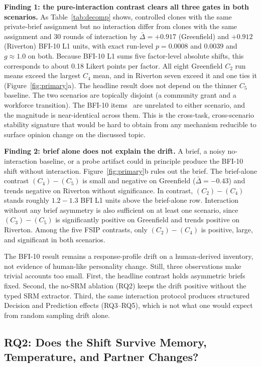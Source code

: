 \textbf{Finding 1: the pure-interaction contrast clears all three gates in both scenarios.} As Table~\ref{tab:decomp} shows, controlled clones with the same private-brief assignment but no interaction differ from clones with the same assignment and 30 rounds of interaction by $\bar{\Delta}{=}{+}0.917$ (Greenfield) and ${+}0.912$ (Riverton) BFI-10 L1 units, with exact run-level $p{=}0.0008$ and $0.0039$ and $g{\approx}1.0$ on both. Because BFI-10 L1 sums five factor-level absolute shifts, this corresponds to about 0.18 Likert points per factor. All eight Greenfield $C_2$ run means exceed the largest $C_4$ mean, and in Riverton seven exceed it and one ties it (Figure~\ref{fig:primary}a). The headline result does not depend on the thinner $C_5$ baseline. The two scenarios are topically disjoint (a community grant and a workforce transition). The BFI-10 items~\citep{Rammstedt2007_BFI10,PsychoBench} are unrelated to either scenario, and the magnitude is near-identical across them. This is the cross-task, cross-scenario stability signature that would be hard to obtain from any mechanism reducible to surface opinion change on the discussed topic.

\textbf{Finding 2: brief alone does not explain the drift.} A brief, a noisy no-interaction baseline, or a probe artifact could in principle produce the BFI-10 shift without interaction. Figure~\ref{fig:primary}b rules out the brief. The brief-alone contrast $(C_4){-}(C_5)$ is small and negative on Greenfield ($\bar{\Delta}{=}{-}0.43$) and trends negative on Riverton without significance. In contrast, $(C_2){-}(C_4)$ stands roughly $1.2{-}1.3$ BFI L1 units above the brief-alone row. Interaction without any brief asymmetry is also sufficient on at least one scenario, since $(C_3){-}(C_5)$ is significantly positive on Greenfield and trends positive on Riverton. Among the five FSIP contrasts, only $(C_2){-}(C_4)$ is positive, large, and significant in both scenarios.

The BFI-10 result remains a response-profile drift on a human-derived inventory, not evidence of human-like personality change. Still, three observations make trivial accounts too small. First, the headline contrast holds asymmetric briefs fixed. Second, the no-SRM ablation (RQ2) keeps the drift positive without the typed SRM extractor. Third, the same interaction protocol produces structured Decision and Prediction effects (RQ3--RQ5), which is not what one would expect from random sampling drift alone.

\subsection{RQ2: Does the Shift Survive Memory, Temperature, and Partner Changes?}\label{sec:exp-srm}

